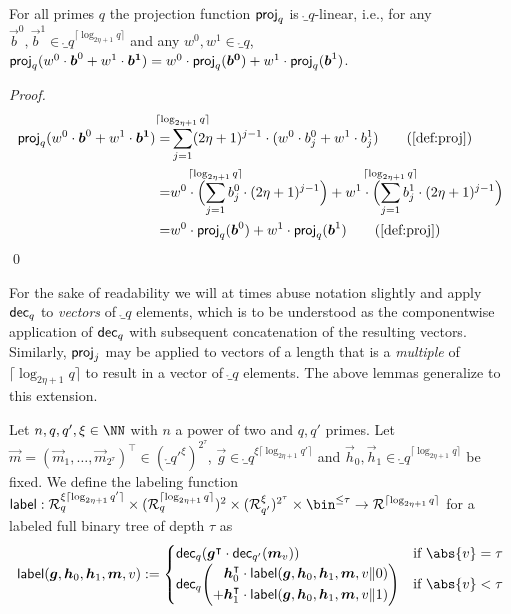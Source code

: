 \begin{lemma}\label{lem:projislin}
  For all primes $q$ the projection function $\mathsf{proj}_q$ is $\ring_q$-linear, i.e., for any $\vec{b}^0,\vec{b}^1 \in \ring_q^{\lceil\log_{2\eta+1} q\rceil}$ and any $w^0,w^1 \in \ring_q$, $\mathsf{proj}_q(w^0\cdot\boldsymbol{b}^0+w^1\cdot\boldsymbol{b^1}) = w^0\cdot\mathsf{proj}_q(\boldsymbol{b^0}) + w^1\cdot\mathsf{proj}_q(\boldsymbol{b}^1)$.
\end{lemma}
\begin{proof}
  \begin{align*}
    \vspace{-1cm}
    \proj_q(w^0\cdot\vec{b}^0+w^1\cdot\vec{b^1})
    =&\smashoperator{\sum_{j=1}^{\lceil\log_{2\eta+1} q\rceil}} (2\eta+1)^{j-1}\cdot (w^0\cdot b^0_j+w^1\cdot b^1_j)\tag{\autoref{def:proj}}\\
    =&w^0\cdot \Bigl(\smashoperator{\sum_{j=1}^{\lceil\log_{2\eta+1} q\rceil}} b^0_j\cdot (2\eta+1)^{j-1}\Bigr) + w^1\cdot\Bigl( \smashoperator{\sum_{j=1}^{\lceil\log_{2\eta+1} q\rceil}} b^1_j\cdot (2\eta+1)^{j-1}\Bigr)\\
    =&w^0\cdot \proj_q(\vec{b}^0) + w^1\cdot\proj_q(\vec{b}^1)\tag{\autoref{def:proj}}
  \end{align*}
  \qed
\end{proof}
%
For the sake of readability we will at times abuse notation slightly and apply $\mathsf{dec}_q$ to \emph{vectors} of $\ring_q$ elements, which is to be understood as the componentwise application of $\mathsf{dec}_q$ with subsequent concatenation of the resulting vectors.
Similarly, $\mathsf{proj}_j$ may be applied to vectors of a length that is a \emph{multiple} of $\lceil\log_{2\eta+1} q\rceil$ to result in a vector of $\ring_q$ elements.
The above lemmas generalize to this extension.

\begin{definition}\label{def:label}
  Let $n,q,q',\xi\in\NN$ with $n$ a power of two and $q,q'$ primes.
  Let $\vec{m}=(\vec{m}_{1},\dots,\vec{m}_{{2^{\tau}}})^\intercal\in(\ring_{q'}^\xi)^{2^{\tau}}$, $\vec{g} \in \ring_{q}^{\xi\lceil\log_{2\eta+1} q'\rceil}$ and $\vec{h}_0,\vec{h}_1 \in \ring_q^{\lceil\log_{2\eta+1} q\rceil}$ be fixed.
  We define the labeling function $\lbl : \ring_{q}^{\xi\lceil\log_{2\eta+1} q'\rceil} \times (\ring_q^{\lceil\log_{2\eta+1} q\rceil})^2 \times (\ring^\xi_{q'})^{2^{\tau}}\times \bin^{\leq \tau} \to \ring^{\lceil \log_{2\eta+1} q \rceil}$ for a labeled full binary tree of depth $\tau$ as
  \[
    \lbl(\vec{g}, \vec{h}_0,\vec{h}_1,\vec{m},v) := \begin{cases} \decomp_{q}(\vec{g}^\intercal\cdot \decomp_{q'}(\vec{m}_{v})) & \text{if } \abs{v}=\tau\\ \decomp_q\mleft(\begin{aligned}\vec{h}_0^\intercal \cdot\lbl(\vec{g},\vec{h}_0,\vec{h}_1,\vec{m},v\Vert 0)\\ + \vec{h}_1^\intercal \cdot\lbl(\vec{g},\vec{h}_0,\vec{h}_1,\vec{m},v\Vert 1)\end{aligned}\mright)& \text{if } \abs{v}< \tau\end{cases}
  \]
\end{definition}

